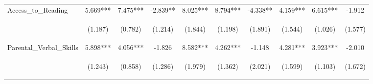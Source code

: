 \begin{tabular}{lccccccccc}
\noalign{\smallskip}Access_to_Reading & 5.669*** & 7.475*** & -2.839** & 8.025*** & 8.794*** & -4.338** & 4.159*** & 6.615*** & -1.912\\
 & \begin{footnotesize}(1.187)\end{footnotesize} & \begin{footnotesize}(0.782)\end{footnotesize} & \begin{footnotesize}(1.214)\end{footnotesize} & \begin{footnotesize}(1.844)\end{footnotesize} & \begin{footnotesize}(1.198)\end{footnotesize} & \begin{footnotesize}(1.891)\end{footnotesize} & \begin{footnotesize}(1.544)\end{footnotesize} & \begin{footnotesize}(1.026)\end{footnotesize} & \begin{footnotesize}(1.577)\end{footnotesize}\\
\noalign{\smallskip}Parental_Verbal_Skills & 5.898*** & 4.056*** & -1.826 & 8.582*** & 4.262*** & -1.148 & 4.281*** & 3.923*** & -2.010\\
 & \begin{footnotesize}(1.243)\end{footnotesize} & \begin{footnotesize}(0.858)\end{footnotesize} & \begin{footnotesize}(1.286)\end{footnotesize} & \begin{footnotesize}(1.979)\end{footnotesize} & \begin{footnotesize}(1.362)\end{footnotesize} & \begin{footnotesize}(2.021)\end{footnotesize} & \begin{footnotesize}(1.599)\end{footnotesize} & \begin{footnotesize}(1.103)\end{footnotesize} & \begin{footnotesize}(1.672)\end{footnotesize}\\

\end{tabular}
